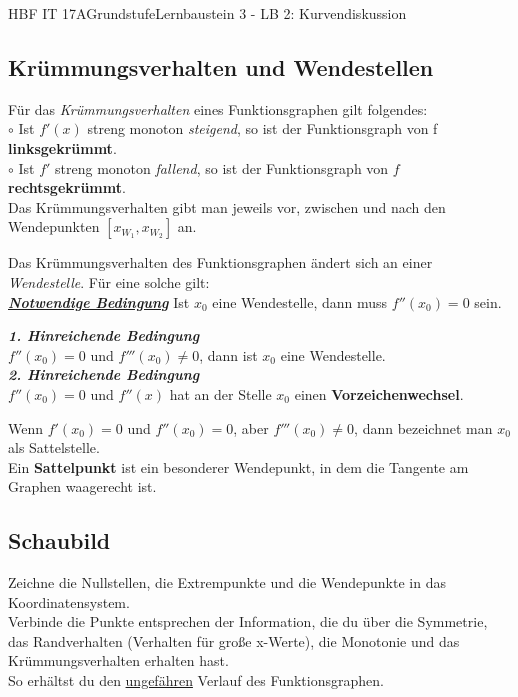 \documentclass[11pt,twocolumn,oneside,openany,headings=optiontotoc,11pt,numbers=noenddot]{article}
\begin{document}
\begin{worksheet}{HBF IT 17A}{Grundstufe}{Lernbaustein 3 - LB 2: Kurvendiskussion}
		\subsection{Krümmungsverhalten und Wendestellen}
		Für das \textit{Krümmungsverhalten} eines Funktionsgraphen gilt folgendes:\\
		\(\circ\) Ist \(f'(x)\) streng monoton \textit{steigend}, so ist der Funktionsgraph von f \textbf{linksgekrümmt}.\\
		\(\circ\) Ist \(f'\) streng monoton \textit{fallend}, so ist der Funktionsgraph von \(f\) \textbf{rechtsgekrümmt}.\\
		\small{Das Krümmungsverhalten gibt man jeweils vor, zwischen und nach den Wendepunkten \([x_{W_1}, x_{W_2}]\) an.}\normalsize
		\par\noindent
		Das Krümmungsverhalten des Funktionsgraphen ändert sich an einer \textit{Wendestelle}. Für eine solche gilt:\\
		\textit{\underline{\textbf{Notwendige Bedingung}}} Ist \(x_0\) eine Wendestelle, dann muss \(f''(x_0)  = 0\) sein.\\
		\par\noindent
		\textbf{\textit{1. Hinreichende Bedingung}}\\
		\(f''(x_0)=0\) und \(f'''(x_0) \neq 0\), dann ist \(x_0\) eine Wendestelle.\\
		\textbf{\textit{2. Hinreichende Bedingung}}\\\(f''(x_0)=0\) und \(f''(x)\) hat an der Stelle \(x_0\) einen \textbf{Vorzeichenwechsel}.\\
		\par\noindent
		Wenn \(f'(x_0) = 0\) und \(f''(x_0)= 0\), aber \(f'''(x_0)\neq 0\), dann bezeichnet man \(x_0\) als Sattelstelle.\\
		Ein \textbf{Sattelpunkt} ist ein besonderer Wendepunkt, in dem die Tangente am Graphen waagerecht ist.\\
		\subsection{Schaubild} Zeichne die Nullstellen, die Extrempunkte und die Wendepunkte in das Koordinatensystem.\\
		Verbinde die Punkte entsprechen der Information, die du über die Symmetrie, das Randverhalten (Verhalten für große x-Werte), die Monotonie und das Krümmungsverhalten erhalten hast.\\
		So erhältst du den \underline{ungefähren} Verlauf des Funktionsgraphen.\\
		\\

\end{worksheet}
\end{document}
